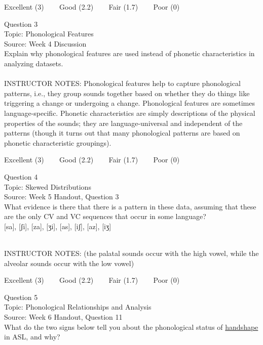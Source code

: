 \documentclass[12pt]{article}
\begin{document}
\vfill
Excellent (3) ~~~ Good (2.2) ~~~ Fair (1.7) ~~~ Poor (0)
\newpage

{\large Question 3}\\

Topic: Phonological Features\\
Source: Week 4 Discussion\\

Explain why phonological features are used instead of phonetic characteristics in analyzing datasets.\\


~\\
INSTRUCTOR NOTES: Phonological features help to capture phonological patterns, i.e., they group sounds together based on whether they do things like triggering a change or undergoing a change. Phonological features are sometimes language-specific. Phonetic characteristics are simply descriptions of the physical properties of the sounds; they are language-universal and independent of the patterns (though it turns out that many phonological patterns are based on phonetic characteristic groupings).


\vfill
Excellent (3) ~~~ Good (2.2) ~~~ Fair (1.7) ~~~ Poor (0)
\newpage

{\large Question 4}\\

Topic: Skewed Distributions\\
Source: Week 5 Handout, Question 3\\

What evidence is there that there is a pattern in these data, assuming that these are the only CV and VC sequences that occur in some language?\\

{[sa]}, {[ʃi]}, {[za]}, {[ʒi]}, {[as]}, {[iʃ]}, {[az]}, {[iʒ]}


~\\
INSTRUCTOR NOTES: (the palatal sounds occur with the high vowel, while the alveolar sounds occur with the low vowel)


\vfill
Excellent (3) ~~~ Good (2.2) ~~~ Fair (1.7) ~~~ Poor (0)
\newpage

{\large Question 5}\\

Topic: Phonological Relationships and Analysis\\
Source: Week 6 Handout, Question 11\\

What do the two signs below tell you about the phonological status of \underline{handshape} in ASL, and why?\\
\end{document}
